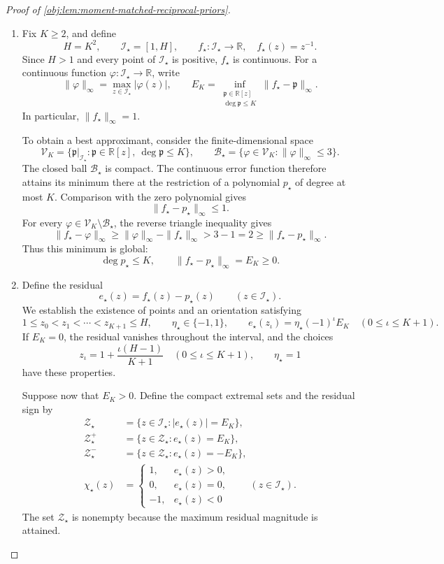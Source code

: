 \documentclass[11pt]{article}
\begin{document}
\begin{proof}[Proof of \cref{obj:lem:moment-matched-reciprocal-priors}]
\begin{enumerate}
\item Fix \(K\ge2\), and define
\[
H=K^2,\qquad
\mathcal I_\star=[1,H],\qquad
f_\star:\mathcal I_\star\to\mathbb R,\quad f_\star(z)=z^{-1}.
\]
Since \(H>1\) and every point of \(\mathcal I_\star\) is positive, \(f_\star\) is continuous. For a continuous function \(\varphi:\mathcal I_\star\to\mathbb R\), write
\[
\|\varphi\|_\infty=\max_{z\in\mathcal I_\star}|\varphi(z)|,
\qquad
E_K=\inf_{\substack{\mathfrak p\in\mathbb R[z]\\ \deg\mathfrak p\le K}}
\|f_\star-\mathfrak p\|_\infty.
\]
In particular, \(\|f_\star\|_\infty=1\).

To obtain a best approximant, consider the finite-dimensional space
\[
\mathcal V_K
=\{\mathfrak p|_{\mathcal I_\star}:
  \mathfrak p\in\mathbb R[z],\ \deg\mathfrak p\le K\},
\qquad
\mathcal B_\star
=\{\varphi\in\mathcal V_K:\|\varphi\|_\infty\le3\}.
\]
The closed ball \(\mathcal B_\star\) is compact. The continuous error function therefore attains its minimum there at the restriction of a polynomial \(p_\star\) of degree at most \(K\). Comparison with the zero polynomial gives
\[
\|f_\star-p_\star\|_\infty\le1.
\]
For every \(\varphi\in\mathcal V_K\setminus\mathcal B_\star\), the reverse triangle inequality gives
\[
\|f_\star-\varphi\|_\infty
\ge\|\varphi\|_\infty-\|f_\star\|_\infty
>3-1=2
\ge\|f_\star-p_\star\|_\infty.
\]
Thus this minimum is global:
\[
\deg p_\star\le K,\qquad
\|f_\star-p_\star\|_\infty=E_K\ge0.
\]

\item Define the residual
\[
e_\star(z)=f_\star(z)-p_\star(z)
\qquad(z\in\mathcal I_\star).
\]
We establish the existence of points and an orientation satisfying
\[
1\le z_0<z_1<\cdots<z_{K+1}\le H,\qquad
\eta_\star\in\{-1,1\},\qquad
e_\star(z_\iota)=\eta_\star(-1)^\iota E_K
\quad(0\le\iota\le K+1).
\]
If \(E_K=0\), the residual vanishes throughout the interval, and the choices
\[
z_\iota=1+\frac{\iota(H-1)}{K+1}
\quad(0\le\iota\le K+1),
\qquad
\eta_\star=1
\]
have these properties.

Suppose now that \(E_K>0\). Define the compact extremal sets and the residual sign by
\[
\begin{aligned}
\mathcal Z_\star
&=\{z\in\mathcal I_\star:|e_\star(z)|=E_K\},\\
\mathcal Z_\star^+
&=\{z\in\mathcal Z_\star:e_\star(z)=E_K\},\\
\mathcal Z_\star^-
&=\{z\in\mathcal Z_\star:e_\star(z)=-E_K\},\\
\chi_\star(z)
&=
\begin{cases}
1,&e_\star(z)>0,\\
0,&e_\star(z)=0,\\
-1,&e_\star(z)<0
\end{cases}
\qquad(z\in\mathcal I_\star).
\end{aligned}
\]
The set \(\mathcal Z_\star\) is nonempty because the maximum residual magnitude is attained.


\end{enumerate}
\end{proof}
\end{document}
